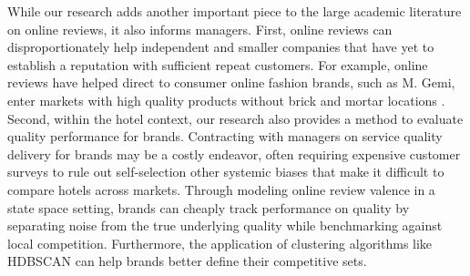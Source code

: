 \documentclass[mksc,blindrev]{informs3} %
\begin{document}
While our research adds another important piece to the large academic literature on online reviews, it also informs managers. First, online reviews can disproportionately help independent and smaller companies that have yet to establish a reputation with sufficient repeat customers. For example, online reviews have helped direct to consumer online fashion brands, such as M. Gemi, enter markets with high quality products without brick and mortar locations . Second, within the hotel context, our research also provides a method to evaluate quality performance for brands. Contracting with managers on service quality delivery for brands may be a costly endeavor, often requiring expensive customer surveys to rule out self-selection other systemic biases that make it difficult to compare hotels across markets. Through modeling online review valence in a state space setting, brands can cheaply track performance on quality by separating noise from the true underlying quality while benchmarking against local competition. Furthermore, the application of clustering algorithms like HDBSCAN can help brands better define their competitive sets. 
\end{document}
